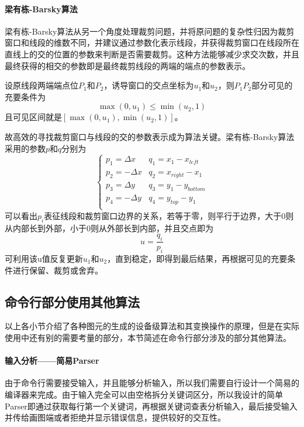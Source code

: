 \documentclass[a4paper,UTF8]{article}
\theoremstyle{definition}
\begin{document}
\paragraph{梁有栋-Barsky算法}
梁有栋-Barsky算法从另一个角度处理裁剪问题，并将原问题的复杂性归因为裁剪窗口和线段的维数不同，并建议通过参数化表示线段，并获得裁剪窗口在线段所在直线上的交的位置的参数来判断是否需要裁剪。这种方法能够减少求交次数，并且最终获得的相交的参数即是最终裁剪线段的两端的端点的参数表示。
\par 设原线段两端端点位$P_1$和$P_2$，诱导窗口的交点坐标为$u_1$和$u_2$，则$P_1P_2$部分可见的充要条件为
\begin{equation}
\max(0,u_1)\leq \min(u_2,1)
\end{equation}
且可见区间就是$[\max(0,u_1),\min(u_2,1)]$。
\par 故高效的寻找裁剪窗口与线段的交的参数表示成为算法关键。梁有栋-Barsky算法采用的参数$p$和$q$分别为
\begin{equation}
\left\{
\begin{array}{ll}
p_1=\Delta x & q_1=x_1-x_{left} \\
p_2=-\Delta x & q_2=x_{right}-x_1 \\
p_3=\Delta y & q_3=y_1-y_{bottom} \\
p_4=-\Delta y & q_4=y_{top}-y_1 \\
\end{array}
\right.
\end{equation}
可以看出$p_i$表征线段和裁剪窗口边界的关系，若等于零，则平行于边界，大于0则从内部长到外部，小于0则从外部长到内部，并且交点即为
\begin{equation}
u=\frac{q_i}{p_i}
\end{equation}
可利用该u值反复更新$u_1$和$u_2$，直到稳定，即得到最后结果，再根据可见的充要条件进行保留、裁剪或舍弃\cite{graphTextBook}。
\subsection{命令行部分使用其他算法}
以上各小节介绍了各种图元的生成的设备级算法和其变换操作的原理，但是在实际使用中还有别的需要考量的部分，本节简述在命令行部分涉及的部分其他算法。
\paragraph{输入分析——简易Parser} 由于命令行需要接受输入，并且能够分析输入，所以我们需要自行设计一个简易的编译器来完成。由于输入完全可以由空格拆分关键词区分，所以我设计的简单Parser即通过获取每行第一个关键词，再根据关键词查表分析输入，最后接受输入并传给画图端或者拒绝并显示错误信息，提供较好的交互性。
\end{document}
